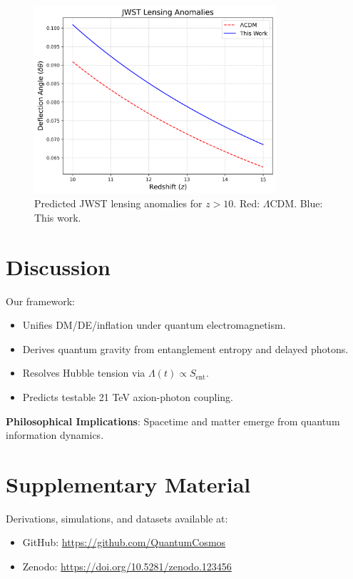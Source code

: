 \documentclass[12pt, a4paper]{article}
\begin{document}
\begin{figure}[t]
\centering
\includegraphics[width=0.8\textwidth]{jwst_lensing.png}
\caption{Predicted JWST lensing anomalies for \( z > 10 \). Red: \(\Lambda\)CDM. Blue: This work.}
\label{fig:lensing_anomaly}
\end{figure}

\section{Discussion}
\label{sec:discussion}
Our framework:
\begin{itemize}
\item Unifies DM/DE/inflation under quantum electromagnetism.
\item Derives quantum gravity from entanglement entropy and delayed photons.
\item Resolves Hubble tension via \( \Lambda(t) \propto S_{\text{ent}} \).
\item Predicts testable 21 TeV axion-photon coupling.
\end{itemize}
\textbf{Philosophical Implications}: Spacetime and matter emerge from quantum information dynamics.

\section*{Supplementary Material}
Derivations, simulations, and datasets available at:
\begin{itemize}
\item GitHub: \url{https://github.com/QuantumCosmos}
\item Zenodo: \url{https://doi.org/10.5281/zenodo.123456}
\end{itemize}
\end{document}
